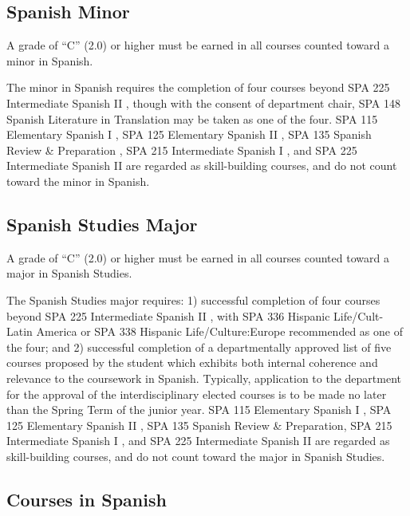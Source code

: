 \documentclass[
  letterpaper,
]{scrbook}
\begin{document}
\subsection{Spanish Minor}\label{spanish-minor}

A grade of ``C'' (2.0) or higher must be earned in all courses counted
toward a minor in Spanish.

The minor in Spanish requires the completion of four courses beyond SPA
225 Intermediate Spanish II , though with the consent of department
chair, SPA 148 Spanish Literature in Translation may be taken as one of
the four. SPA 115 Elementary Spanish I , SPA 125 Elementary Spanish II ,
SPA 135 Spanish Review \& Preparation , SPA 215 Intermediate Spanish I ,
and SPA 225 Intermediate Spanish II are regarded as skill-building
courses, and do not count toward the minor in Spanish.

\subsection{Spanish Studies Major}\label{spanish-studies-major}

A grade of ``C'' (2.0) or higher must be earned in all courses counted
toward a major in Spanish Studies.

The Spanish Studies major requires: 1) successful completion of four
courses beyond SPA 225 Intermediate Spanish II , with SPA 336 Hispanic
Life/Cult-Latin America or SPA 338 Hispanic Life/Culture:Europe
recommended as one of the four; and 2) successful completion of a
departmentally approved list of five courses proposed by the student
which exhibits both internal coherence and relevance to the coursework
in Spanish. Typically, application to the department for the approval of
the interdisciplinary elected courses is to be made no later than the
Spring Term of the junior year. SPA 115 Elementary Spanish I , SPA 125
Elementary Spanish II , SPA 135 Spanish Review \& Preparation, SPA 215
Intermediate Spanish I , and SPA 225 Intermediate Spanish II are
regarded as skill-building courses, and do not count toward the major in
Spanish Studies.

\subsection{Courses in Spanish}\label{courses-in-spanish}
\end{document}

